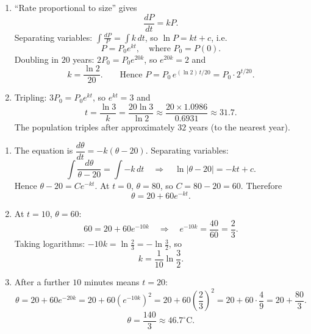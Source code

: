 \documentclass[11pt]{article}
\begin{document}
\begin{corrige}
\begin{enumerate}
\item ``Rate proportional to size'' gives
\[
\frac{dP}{dt} = kP.
\]
Separating variables: $\displaystyle\int \frac{dP}{P} = \int k\,dt$, so $\ln P = kt + c$, i.e.
\[
P = P_0 e^{kt}, \quad \text{where } P_0 = P(0).
\]
Doubling in $20$ years: $2P_0 = P_0 e^{20k}$, so $e^{20k} = 2$ and
\[
k = \frac{\ln 2}{20}.
\qquad\text{Hence } P = P_0\, e^{(\ln 2)\,t/20} = P_0 \cdot 2^{t/20}.
\]

\item Tripling: $3P_0 = P_0 e^{kt}$, so $e^{kt} = 3$ and
\[
t = \frac{\ln 3}{k} = \frac{20\ln 3}{\ln 2} \approx \frac{20 \times 1.0986}{0.6931} \approx 31.7.
\]
The population triples after approximately $\boxed{32}$ years (to the nearest year).
\end{enumerate}
\end{corrige}

\begin{corrige}
\begin{enumerate}
\item The equation is $\dfrac{d\theta}{dt} = -k(\theta - 20)$. Separating variables:
\[
\int \frac{d\theta}{\theta - 20} = \int -k\,dt
\quad\Longrightarrow\quad \ln|\theta - 20| = -kt + c.
\]
Hence $\theta - 20 = Ce^{-kt}$. At $t = 0$, $\theta = 80$, so $C = 80 - 20 = 60$. Therefore
\[
\boxed{\theta = 20 + 60e^{-kt}}.
\]

\item At $t = 10$, $\theta = 60$:
\[
60 = 20 + 60e^{-10k} \quad\Longrightarrow\quad e^{-10k} = \frac{40}{60} = \frac{2}{3}.
\]
Taking logarithms: $-10k = \ln\frac{2}{3} = -\ln\frac{3}{2}$, so
\[
\boxed{k = \frac{1}{10}\ln\frac{3}{2}}.
\]

\item After a further $10$ minutes means $t = 20$:
\[
\theta = 20 + 60e^{-20k} = 20 + 60\left(e^{-10k}\right)^2 = 20 + 60\left(\frac{2}{3}\right)^2 = 20 + 60\cdot\frac{4}{9} = 20 + \frac{80}{3}.
\]
\[
\theta = \frac{140}{3} \approx 46.7^{\circ}\mathrm{C}.
\]
\end{enumerate}
\end{corrige}
\end{document}
